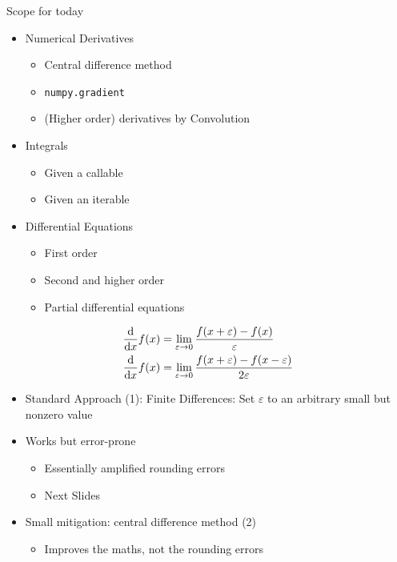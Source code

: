 \begin{frame}{Scope for today}
%
\begin{itemize}
\item Numerical Derivatives
	\begin{itemize}
	\item Central difference method
	\item \texttt{numpy.gradient}
	\item (Higher order) derivatives by Convolution
	\end{itemize}
\item Integrals
	\begin{itemize}
	\item Given a callable
	\item Given an iterable
	\end{itemize}
\item Differential Equations
	\begin{itemize}
	\item First order
	\item Second and higher order
	\item Partial differential equations
	\end{itemize}
\end{itemize}
%
\end{frame}


\begin{frame}%
%
\begin{defbox}
\begin{align}
	\dv{x} f(x)
&=
	\lim_{\varepsilon \to 0}
		\dfrac{f(x + \varepsilon) - f(x)}{\varepsilon}
\\
	\dv{x} f(x)
&=
	\lim_{\varepsilon \to 0}
		\dfrac{f(x + \varepsilon) - f(x - \varepsilon)}{2\varepsilon}
\end{align}
\end{defbox}
%
\begin{itemize}
\item Standard Approach (1): Finite Differences: Set $\varepsilon$ to an arbitrary small but nonzero value
\item Works but error-prone
	\begin{itemize}
	\item Essentially amplified rounding errors
	\item Next Slides
	\end{itemize}
\item Small mitigation: central difference method (2)
	\begin{itemize}
	\item Improves the maths, not the rounding errors
	\end{itemize}
\end{itemize}
%
\end{frame}

